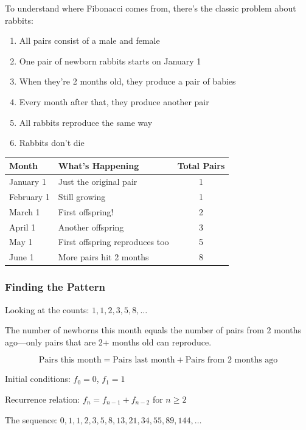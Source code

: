 \documentclass[11pt,a4paper]{article}
\begin{document}
To understand where Fibonacci comes from, there's the classic problem about rabbits:

\begin{tipbox}
\begin{enumerate}[noitemsep]
    \item All pairs consist of a male and female
    \item One pair of newborn rabbits starts on January 1
    \item When they're 2 months old, they produce a pair of babies
    \item Every month after that, they produce another pair
    \item All rabbits reproduce the same way
    \item Rabbits don't die
\end{enumerate}
\end{tipbox}

\begin{center}
\begin{tabular}{l l c}
\toprule
\textbf{Month} & \textbf{What's Happening} & \textbf{Total Pairs} \\
\midrule
January 1 & Just the original pair & 1 \\
February 1 & Still growing & 1 \\
March 1 & First offspring! & 2 \\
April 1 & Another offspring & 3 \\
May 1 & First offspring reproduces too & 5 \\
June 1 & More pairs hit 2 months & 8 \\
\bottomrule
\end{tabular}
\end{center}

\subsubsection{Finding the Pattern}

Looking at the counts: $1, 1, 2, 3, 5, 8, \ldots$

The number of newborns this month equals the number of pairs from 2 months ago---only pairs that are 2+ months old can reproduce.

\begin{formulabox}
$$\text{Pairs this month} = \text{Pairs last month} + \text{Pairs from 2 months ago}$$
\end{formulabox}

\begin{definitionbox}
Initial conditions: $f_0 = 0$, $f_1 = 1$

Recurrence relation: $f_n = f_{n-1} + f_{n-2}$ for $n \geq 2$

The sequence: $0, 1, 1, 2, 3, 5, 8, 13, 21, 34, 55, 89, 144, \ldots$
\end{definitionbox}
\end{document}
